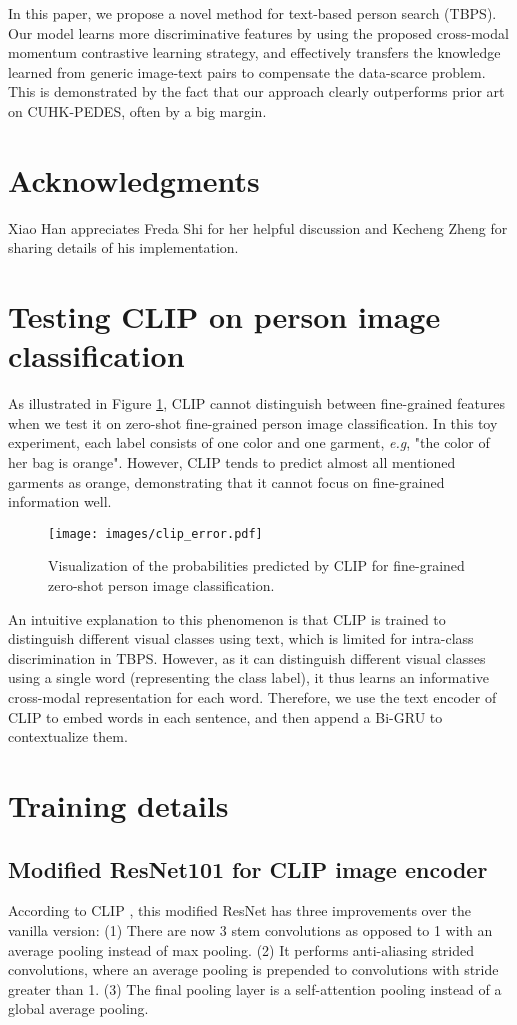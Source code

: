 \documentclass{bmvc2k}
\def\eg{\emph{e.g}\bmvaOneDot}
\begin{document}
In this paper, we propose a novel method for text-based person search (TBPS).
Our model learns more discriminative features by using the proposed cross-modal momentum contrastive learning strategy, and
effectively transfers the knowledge learned from generic image-text pairs to compensate the data-scarce problem.
This is demonstrated by the fact that our approach clearly outperforms prior art on CUHK-PEDES, often by a big margin.

\section*{Acknowledgments}
Xiao Han appreciates Freda Shi for her helpful discussion and Kecheng Zheng for sharing details of his implementation. \newpage
\appendix
\section{Testing CLIP on person image classification}
As illustrated in Figure \ref{clip_error}, CLIP cannot distinguish between fine-grained features when we test it on zero-shot fine-grained person image classification. In this toy experiment, each label consists of one color and one garment, \eg, "the color of her bag is orange". However, CLIP tends to predict almost all mentioned garments as orange, demonstrating that it cannot focus on fine-grained information well.
\begin{figure}[h]
\centering
\texttt{[image: images/clip\_error.pdf]}
\caption{Visualization of the probabilities predicted by CLIP \cite{radford2021clip} for fine-grained zero-shot person image classification.}
\label{clip_error}
\end{figure} 
An intuitive explanation to this phenomenon is that CLIP is trained to distinguish different visual classes using text, which is limited for intra-class discrimination in TBPS. However, as it can distinguish different visual classes using a single word (representing the class label), it thus learns an informative cross-modal representation for each word. Therefore, we use the text encoder of CLIP to embed words in each sentence, and then append a Bi-GRU to contextualize them.


\section{Training details}

\subsection{Modified ResNet101 for CLIP image encoder} 
According to CLIP \cite{radford2021clip}, this modified ResNet has three improvements over the vanilla version: (1) There are now 3 stem convolutions as opposed to 1 with an average pooling instead of max pooling. (2) It performs anti-aliasing strided convolutions, where an average pooling is prepended to convolutions with stride greater than 1. (3) The final pooling layer is a self-attention pooling instead of a global average pooling.
\end{document}

